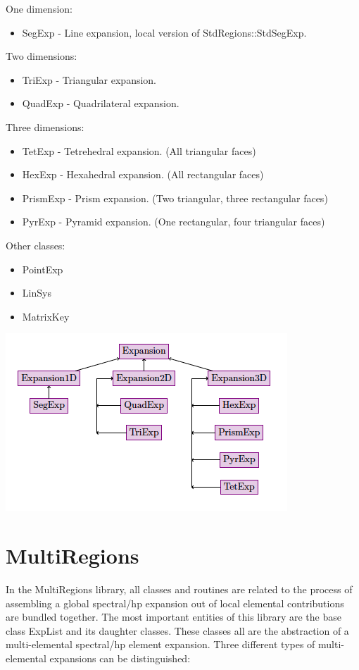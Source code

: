 One dimension:
\begin{itemize}
\item SegExp - Line expansion, local version of StdRegions::StdSegExp.
\end{itemize}

Two dimensions:
\begin{itemize}
\item TriExp - Triangular expansion.
\item QuadExp - Quadrilateral expansion.
\end{itemize}

Three dimensions:
\begin{itemize}
\item TetExp - Tetrehedral expansion. (All triangular faces) 
\item HexExp - Hexahedral expansion. (All rectangular faces)
\item PrismExp - Prism expansion. (Two triangular, three rectangular faces)
\item PyrExp - Pyramid expansion. (One rectangular, four triangular faces)
\end{itemize}

Other classes:
\begin{itemize}
\item PointExp
\item LinSys
\item MatrixKey
\end{itemize}

\begin{center}
\includegraphics{img/LocalRegions.png}
\end{center}

\section{MultiRegions}
In the MultiRegions library, all classes and routines are related to the
process of assembling a global spectral/hp expansion out of local elemental
contributions are bundled together. The most important entities of this library
are the base class ExpList and its daughter classes. These classes all are the
abstraction of a multi-elemental spectral/hp element expansion. Three different
types of multi-elemental expansions can be distinguished:

